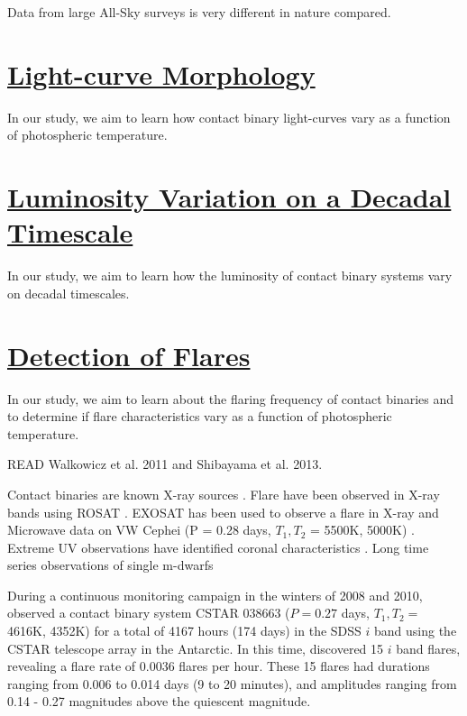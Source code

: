 \documentclass[12pt]{article} %
\numberwithin{equation}{section} %
\begin{document}
Data from large All-Sky surveys is very different in nature compared. 

\section[Light-curve Morphology]{\hyperlink{toc}{Light-curve Morphology}} \label{sec: lc_morph}

In our study, we aim to learn how contact binary light-curves vary as a function of photospheric temperature.

\cite{o1951so}

\section[Luminosity Variation on a Decadal Timescale]{\hyperlink{toc}{Luminosity Variation on a Decadal Timescale}} \label{sec: dec_var}

In our study, we aim to learn how the luminosity of contact binary systems vary on decadal timescales.

\section[Detection of Flares]{\hyperlink{toc}{Detection of Flares}} \label{sec: flares}

In our study, we aim to learn about the flaring frequency of contact binaries and to determine if flare characteristics vary as a function of photospheric temperature.

READ Walkowicz et al. 2011 and Shibayama et al. 2013. 

Contact binaries are known X-ray sources \citep{chen2006w}. Flare have been observed in X-ray bands using ROSAT \citep{mcgale1996rosat}.
EXOSAT has been used to observe a flare in X-ray and Microwave data on VW Cephei (P =  0.28 days, $T_{1}, T_{2}$ = 5500K, 5000K) \citep{vilhu1988simultaneous}. Extreme UV observations have identified coronal characteristics \citep{brickhouse1998extreme}. Long time series observations of single m-dwarfs  \citep{lacy1976uv}

During a continuous monitoring campaign in the winters of 2008 and 2010, \citet{qian2014optical} observed a contact binary system CSTAR 038663 ($P = 0.27$ days, $T_{1}, T_{2} =$ 4616K, 4352K) for a total of 4167 hours (174 days) in the SDSS $i$ band using the CSTAR telescope array in the Antarctic. In this time, \citet{qian2014optical} discovered 15 $i$ band flares, revealing a flare rate of $0.0036$ flares per hour. These 15 flares had durations ranging from 0.006 to 0.014 days (9 to 20 minutes), and amplitudes ranging from 0.14 - 0.27 magnitudes above the quiescent magnitude.
\end{document}
